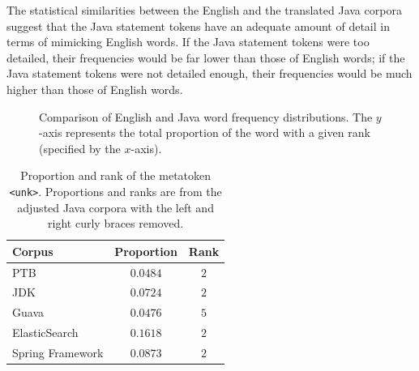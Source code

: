 \documentclass[runningheads,a4paper]{llncs}
\newcommand{\tabhorzspacing}{0.5em}
\newcommand{\tabvertspacing}{1.1}
\begin{document}
The statistical similarities between the English and the translated Java
corpora suggest that the Java statement tokens have an adequate amount of
detail in terms of mimicking English words. If the Java statement tokens
were too detailed, their frequencies would be far lower than those of English
words; if the Java statement tokens were not detailed enough, their
frequencies would be much higher than those of English words.

\begin{figure}
\centering
{} 
\caption{Comparison of English and Java word frequency distributions.
    The $y$-axis represents the total proportion of the word with a given
    rank (specified by the $x$-axis).}
\label{english-frequency}
\end{figure}
 
\begin{table}[t]
    \caption{Proportion and rank of the metatoken 
    \texttt{<unk>}. Proportions and ranks are from the adjusted Java corpora
    with the left and right curly braces removed.}
    \label{sample-table}
    \begin{center}
    \setlength{\tabcolsep}{\tabhorzspacing}
    {\renewcommand{\arraystretch}{\tabvertspacing}
    \begin{tabular}{lcc}
    \hline
    Corpus & Proportion & Rank\\
    \hline
    PTB                 & $0.0484$ & $2$ \\
    JDK                 & $0.0724$ & $2$ \\
    Guava               & $0.0476$ & $5$ \\
    ElasticSearch       & $0.1618$ & $2$ \\
    Spring Framework    & $0.0873$ & $2$  \\
    \hline
    \end{tabular}}
    \end{center}
    \vskip -7mm
\end{table}
\end{document}
